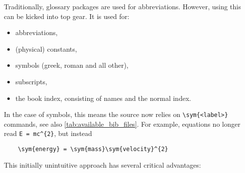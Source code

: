 Traditionally, glossary packages are used for abbreviations.
However, using  this can be kicked into top gear.
It is used for:
\begin{itemize}
    \item abbreviations,
    \item (physical) constants,
    \item symbols (greek, roman and all other),
    \item subscripts,
    \item the book index, consisting of names and the normal index.
\end{itemize}

In the case of symbols, this means the source now relies on \verb|\sym{<label>}|
commands, see also \cref{tab:available_bib_files}.
For example, equations no longer read \verb|E = mc^{2}|, but instead
\begin{verbatim}
    \sym{energy} = \sym{mass}\sym{velocity}^{2}
\end{verbatim}
This initially unintuitive approach has several critical advantages:
